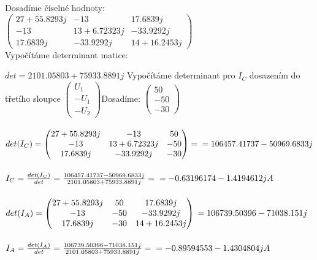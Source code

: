 \documentclass{article}
\begin{document}
\begin{large}
\begin{flushleft}
Dosadíme číselné hodnoty:\\
$\begin{pmatrix}
27+55.8293j & -13 & 17.6839j\\
-13 & 13+6.72323j & -33.9292j\\
17.6839j & -33.9292j & 14+16.2453j
\end{pmatrix}$\\

Vypočítáme determinant matice:

$det=2101.05803+75933.8891j$
\newpage
Vypočítáme determinant pro $I_C$ dosazením do třetího sloupce
$\begin{pmatrix}
U_1\\-U_1\\-U_2
\end{pmatrix}$Dosadíme:
$\begin{pmatrix}
50\\-50\\-30
\end{pmatrix}$\\~\\

$det(I_C)=\begin{pmatrix}
27+55.8293j & -13 & 50\\
-13 & 13+6.72323j & -50\\
17.6839j & -33.9292j & -30
\end{pmatrix}=\newline
=106457.41737-50969.6833j$\\~\\

$I_C=\frac{det(I_C)}{det}=\frac{106457.41737-50969.6833j}{2101.05803+75933.8891j}=\newline=-0.63196174-1.4194612jA$\\~\\

$det(I_A)=\begin{pmatrix}
27+55.8293j & 50 & 17.6839j\\
-13 & -50 & -33.9292j\\
17.6839j & -30 & 14+16.2453j
\end{pmatrix}\newline
=106739.50396-71038.151j$\\~\\

$I_A=\frac{det(I_A)}{det}=\frac{106739.50396-71038.151j}{2101.05803+75933.8891j}=\newline=-0.89594553-1.4304804jA$\\~\\


\end{flushleft}
\end{large}
\end{document}

